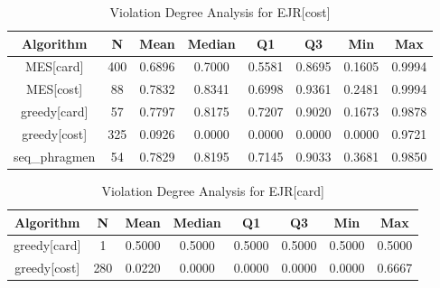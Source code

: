 

\begin{table}[h]
\centering
\begin{tabular}{cccccccc}
\toprule
Algorithm & N & Mean & Median & Q1 & Q3 & Min & Max \\
\midrule
MES[card] & 400 & 0.6896 & 0.7000 & 0.5581 & 0.8695 & 0.1605 & 0.9994 \\
MES[cost] & 88 & 0.7832 & 0.8341 & 0.6998 & 0.9361 & 0.2481 & 0.9994 \\
greedy[card] & 57 & 0.7797 & 0.8175 & 0.7207 & 0.9020 & 0.1673 & 0.9878 \\
greedy[cost] & 325 & 0.0926 & 0.0000 & 0.0000 & 0.0000 & 0.0000 & 0.9721 \\
seq\_phragmen & 54 & 0.7829 & 0.8195 & 0.7145 & 0.9033 & 0.3681 & 0.9850 \\
\bottomrule
\end{tabular}
\caption{Violation Degree Analysis for EJR[cost]}
\end{table}


\begin{table}[h]
\centering
\begin{tabular}{cccccccc}
\toprule
Algorithm & N & Mean & Median & Q1 & Q3 & Min & Max \\
\midrule
greedy[card] & 1 & 0.5000 & 0.5000 & 0.5000 & 0.5000 & 0.5000 & 0.5000 \\
greedy[cost] & 280 & 0.0220 & 0.0000 & 0.0000 & 0.0000 & 0.0000 & 0.6667 \\
\bottomrule
\end{tabular}
\caption{Violation Degree Analysis for EJR[card]}
\end{table}
